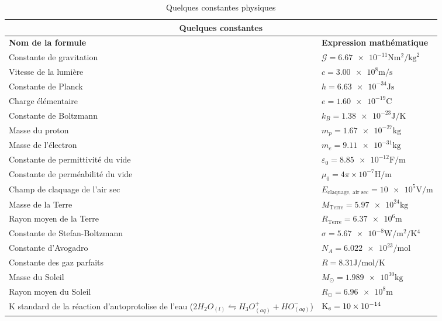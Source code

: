 \documentclass[10pt,a4paper,titlepage,portrait]{article}
\renewcommand{\arraystretch}{2}
\begin{document}
\begin{table}[H]
    \centering
    \renewcommand{\arraystretch}{1.5} %
    \setlength{\tabcolsep}{8pt} %
    \begin{tabular}{@{}p{9cm}p{10cm}@{}}
        \toprule
        \multicolumn{2}{c}{\textbf{Quelques constantes}} \\
        \midrule
        \textbf{Nom de la formule} & \textbf{Expression mathématique} \\
        \midrule
    Constante de gravitation & $\mathcal{G} = \num{6,67e-11} \unit{\newton\meter\squared\per\kilogram\squared}$ \\ 
    Vitesse de la lumière & $c = \num{3,00e8} \unit{\meter\per\second}$ \\ 
    Constante de Planck & $h = \num{6,63e-34} \unit{\joule\second}$ \\ 
    Charge élémentaire & $e = \num{1,60e-19} \unit{\coulomb}$ \\ 
    Constante de Boltzmann & $k_B = \num{1,38e-23} \unit{\joule\per\kelvin}$ \\ 
    Masse du proton & $m_p = \num{1,67e-27} \unit{\kilogram}$ \\ 
    Masse de l'électron & $m_e = \num{9,11e-31} \unit{\kilogram}$ \\ 
    Constante de permittivité du vide & $\varepsilon_0 = \num{8,85e-12} \unit{\farad\per\meter}$ \\ 
    Constante de perméabilité du vide & $\mu_0 = {4\pi\times 10^{-7}} \unit{\henry\per\meter}$ \\ 
    Champ de claquage de l'air sec &$ E_{\text{claquage, air sec}} = \num{10e5} \unit{\volt\per\meter}$ \\
    Masse de la Terre & $M_\text{Terre} = \num{5,97e24} \unit{\kilogram}$ \\ 
    Rayon moyen de la Terre & $R_\text{Terre} = \num{6,37e6} \unit{\meter}$ \\ 
    Constante de Stefan-Boltzmann & $\sigma = \num{5,67e-8} \unit{\watt\per\meter\squared\per\kelvin^4}$ \\ 
    Constante d'Avogadro & $N_A = \num{6,022e23} \unit{\per\mole}$ \\ 
    Constante des gaz parfaits & $R = \num{8,31} \unit{\joule\per\mole\per\kelvin}$ \\ 
    Masse du Soleil & $M_\odot = \num{1,989e30} \unit{\kilogram}$ \\  
    Rayon moyen du Soleil & $R_\odot = \num{6,96e8} \unit{\meter}$ \\ 
    K standard de la réaction d'autoprotolise de l'eau ($2H_2 O_{(l)} \leftrightharpoons H_3O^+_{(aq)} + HO^-_{(aq)}$) & $\mathrm{K}_e= \num{10e{-14}}$ \\
    \bottomrule
\end{tabular}
\caption{Quelques constantes physiques}
\label{tab:constantes}
\end{table}
    
\end{document}
